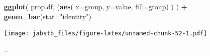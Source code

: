 \documentclass[]{book}
\newenvironment{Shaded}{\begin{snugshade}}{\end{snugshade}}
\newcommand{\DataTypeTok}[1]{\textcolor[rgb]{0.13,0.29,0.53}{#1}}
\newcommand{\KeywordTok}[1]{\textcolor[rgb]{0.13,0.29,0.53}{\textbf{#1}}}
\newcommand{\NormalTok}[1]{#1}
\newcommand{\OperatorTok}[1]{\textcolor[rgb]{0.81,0.36,0.00}{\textbf{#1}}}
\newcommand{\StringTok}[1]{\textcolor[rgb]{0.31,0.60,0.02}{#1}}
\begin{document}
\begin{Shaded}
\begin{Highlighting}[]
\KeywordTok{ggplot}\NormalTok{(}
\NormalTok{  prop.df, }
\NormalTok{  (}\KeywordTok{aes}\NormalTok{(}
    \DataTypeTok{x=}\NormalTok{group, }
    \DataTypeTok{y=}\NormalTok{value, }
    \DataTypeTok{fill=}\NormalTok{group)}
\NormalTok{   )}
\NormalTok{  ) }\OperatorTok{+}
\StringTok{  }\KeywordTok{geom_bar}\NormalTok{(}\DataTypeTok{stat=}\StringTok{"identity"}\NormalTok{)}
\end{Highlighting}
\end{Shaded}

\texttt{[image: jabstb\_files/figure-latex/unnamed-chunk-52-1.pdf]}

..


\end{document}
